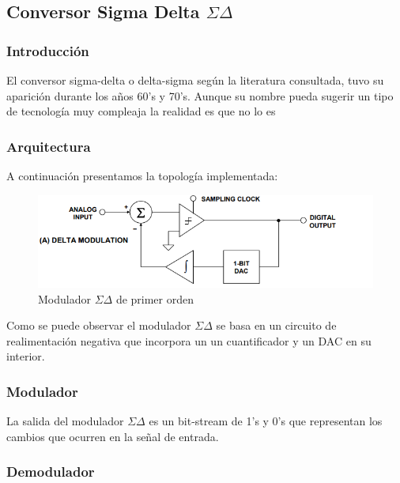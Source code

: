 



\subsection{Conversor Sigma Delta $\Sigma \Delta$}

\subsubsection{Introducción}
El conversor sigma-delta o delta-sigma según la literatura consultada, tuvo su aparición durante los años 60's y 70's. Aunque su nombre pueda sugerir un tipo de tecnología muy compleaja la realidad es que no lo es


\subsubsection{Arquitectura}

A continuación presentamos la topología implementada:

\begin{figure}[H]
	\centering
	\includegraphics[width=0.7\linewidth]{ImagenesEjercicio2/diagramaEnBloques}
	\caption{Modulador $\Sigma\Delta$ de primer orden}
	\label{fig:diagramaenbloques}
\end{figure}

Como se puede observar el modulador $\Sigma\Delta$ se basa en un circuito de realimentación negativa que incorpora un un cuantificador y un DAC en su interior. 



\subsubsection{Modulador}
La salida del modulador $\Sigma\Delta$ es un bit-stream de 1's y 0's que representan los cambios que ocurren en la señal de entrada.



\subsubsection{Demodulador}

